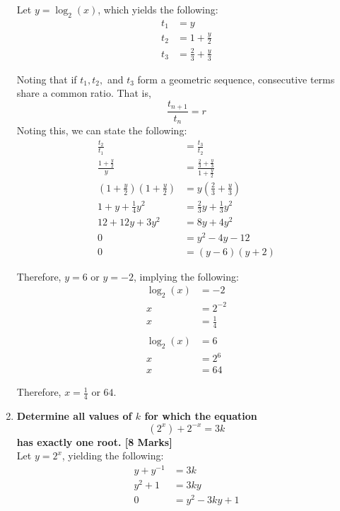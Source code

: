 \documentclass[12pt]{article}
\begin{document}
\begin{enumerate}
    Let $y = \log_2(x)$, which yields the following:
    \begin{align*}
        t_1 &= y \\
        t_2 &= 1 + \frac{y}{2} \\
        t_3 &= \frac{2}{3} + \frac{y}{3}
    \end{align*}
    
    Noting that if $t_1, t_2,$ and $t_3$ form a geometric sequence, consecutive terms share a common ratio. That is, $$\frac{t_{n + 1}}{t_n} = r$$ Noting this, we can state the following:
    \begin{align*}
        \frac{t_2}{t_1} &= \frac{t_3}{t_2} \\
        \frac{1 + \frac{y}{2}}{y} &= \frac{\frac{2}{3} + \frac{y}{3}}{1 + \frac{y}{2}} \\
        (1 + \frac{y}{2})(1 + \frac{y}{2}) &= y(\frac{2}{3} + \frac{y}{3}) \\
        1 + y + \frac{1}{4}y^2 &= \frac{2}{3}y + \frac{1}{3}y^2 \\
        12 + 12y + 3y^2 &= 8y + 4y^2 \\
        0 &= y^2 - 4y - 12 \\
        0 &= (y - 6)(y + 2)
    \end{align*}

    Therefore, $y = 6$ or $y = -2$, implying the following:
    \begin{align*}
        \log_2(x) &= -2 \\
        x &= 2^{-2} \\
        x &= \frac{1}{4} \\ \\
        \log_2(x) &= 6 \\
        x &= 2^6 \\
        x &= 64
    \end{align*}

    Therefore, $x = \frac{1}{4}$ or $64$.

    \item \textbf{Determine all values of $k$ for which the equation $$(2^x) + 2^{-x} = 3k$$ has exactly one root. [8 Marks]} \\
    
    Let $y = 2^x$, yielding the following:
    \begin{align*}
        y + y^{-1} &= 3k \\
        y^2 + 1 &= 3ky \\
        0 &= y^2 - 3ky + 1
    \end{align*}
    

\end{enumerate}
\end{document}
